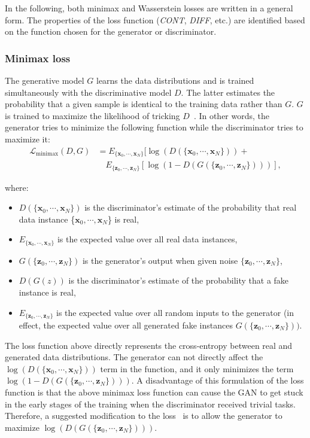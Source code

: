 \documentclass[sn-mathphys-num]{sn-jnl}%
\newcommand \cont{\textit{CONT}}
\newcommand \diff{\textit{DIFF}}
\newcommand{\svec}[1]{\{\ensuremath{\vec{#1}_0, \cdots, \vec{#1}_N}\}}
\renewcommand\vec{\mathbf}
\begin{document}
    In the following, both minimax and Wasserstein losses are written in a general form. The properties of the loss function (\cont, \diff, etc.) are identified based on the function chosen for the generator or discriminator. 
\subsubsection{Minimax loss}
    The generative model $G$ learns the data distributions and is trained simultaneously with the discriminative model $D$. The latter estimates the probability that a given sample is identical to the training data rather than $G$. $G$ is trained to maximize the likelihood of tricking $D$~\cite{minimax}. 
    In other words, the generator tries to minimize the following function while the discriminator tries to maximize it:
    \begin{equation}
        \begin{aligned}
            \mathcal{L}_{\text{minimax}}(D, G) &= E_{\svec{x}}[\log(D(\svec{x})) + \\
            &\quad  E_{\svec{z}}[\log(1 - D(G(\svec{z})))],
        \end{aligned}
    \end{equation}
    
    where: 
    \begin{itemize}
        \item $D(\svec{x})$ is the discriminator's estimate of the probability that real data instance \svec{x} is real, 
        \item $E_{\svec{x}}$ is the expected value over all real data instances,
        \item $G(\svec{z})$ is the generator's output when given noise $\svec{z}$,
        \item $D(G(z))$ is the discriminator's estimate of the probability that a fake instance is real, 
        \item $E_{\svec{z}}$ is the expected value over all random inputs to the generator (in effect, the expected value over all generated fake instances $G(\svec{z}))$.
    \end{itemize}
    The loss function above directly represents the cross-entropy between real and generated data distributions. The generator can not directly affect the $\log(D(\svec{x}))$ term in the function, and it only minimizes the term $\log(1 - D(G(\svec{z})))$. A disadvantage of this formulation of the loss function is that the above minimax loss function can cause the GAN to get stuck in the early stages of the training when the discriminator received trivial tasks. Therefore, a suggested modification to the loss~\cite{minimax} is to allow the generator to maximize $\log (D(G(\svec{z})))$.
\end{document}
